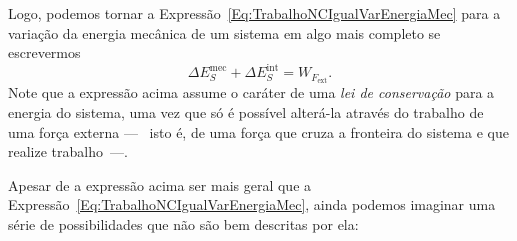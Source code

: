 Logo, podemos tornar a Expressão~\eqref{Eq:TrabalhoNCIgualVarEnergiaMec} para a variação da energia mecânica de um sistema em algo mais completo se escrevermos
\begin{equation}\label{Eq:ConservacaoDaEnergia1}
    \Delta E_S^{\textrm{mec}} + \Delta E_S^{\textrm{int}} = W_{F_{\textrm{ext}}}.
\end{equation}
%
Note que a expressão acima assume o caráter de uma \emph{lei de conservação} para a energia do sistema, uma vez que só é possível alterá-la através do trabalho de uma força externa ---~ isto é, de uma força que cruza a fronteira do sistema e que realize trabalho~---.

Apesar de a expressão acima ser mais geral que a Expressão~\eqref{Eq:TrabalhoNCIgualVarEnergiaMec}, ainda podemos imaginar uma série de possibilidades que não são bem descritas por ela:
